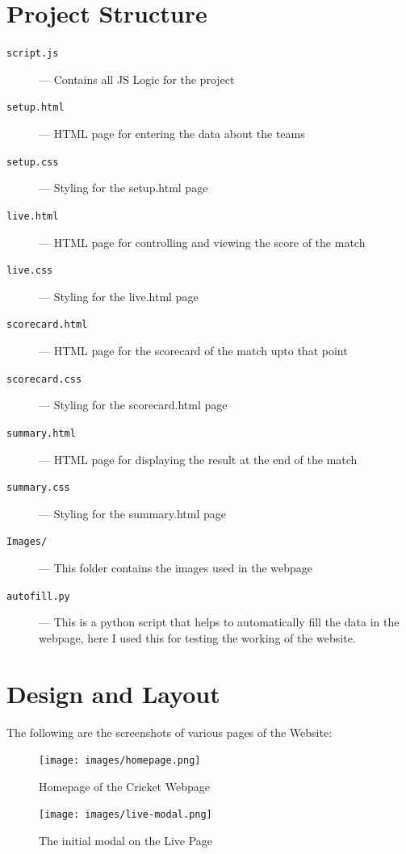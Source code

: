 \documentclass[a4paper,12pt]{article}
\begin{document}
\section{Project Structure}
\vspace{0.3cm}
\begin{description}
\item [\texttt{script.js}] --- Contains all JS Logic for the project
\item [\texttt{setup.html}] --- HTML page for entering the data about the teams
\item [\texttt{setup.css}] --- Styling for the setup.html page
\item [\texttt{live.html}] --- HTML page for controlling and viewing the score of the match
\item [\texttt{live.css}] --- Styling for the live.html page
\item [\texttt{scorecard.html}] --- HTML page for the scorecard of the match upto that point
\item [\texttt{scorecard.css}] --- Styling for the scorecard.html page 
\item [\texttt{summary.html}] --- HTML page for displaying the result at the end of the match 
\item [\texttt{summary.css}] --- Styling for the summary.html page
\item [\texttt{Images/}] --- This folder contains the images used in the webpage
\item [\texttt{autofill.py}] --- This is a python script that helps to automatically fill the data in the \hspace*{2cm} webpage, here I used this for testing the working of the website.
\end{description}
\clearpage

\section{Design and Layout}
The following are the screenshots of various pages of the Website:
\begin{figure}[h!]
\centering
\texttt{[image: images/homepage.png]}
\caption{Homepage of the Cricket Webpage}
\label{homepage}
\end{figure}

\begin{figure}[h!]
\centering
\texttt{[image: images/live-modal.png]}
\caption{The initial modal on the Live Page}
\label{live-modal}
\end{figure}
\clearpage
\end{document}
